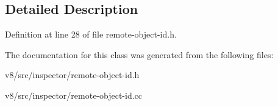 \subsection{Detailed Description}


Definition at line 28 of file remote-\/object-\/id.\+h.



The documentation for this class was generated from the following files\+:\begin{DoxyCompactItemize}
\item 
v8/src/inspector/remote-\/object-\/id.\+h\item 
v8/src/inspector/remote-\/object-\/id.\+cc\end{DoxyCompactItemize}
